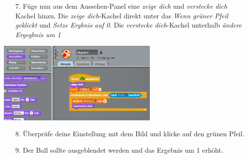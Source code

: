 \begin{itemize}
\item[7.] Füge nun aus dem Aussehen-Panel eine \textit{zeige dich} und \textit{verstecke dich} Kachel hinzu.
\subitem Die \textit{zeige dich}-Kachel direkt unter das \textit{Wenn grüner Pfeil geklickt} und \textit{Setze Ergbnis auf 0}.
\subitem Die \textit{verstecke dich}-Kachel unterhalb \textit{ändere Ergegbnis um 1}
\end{itemize}
\includegraphics[width=0.6\textwidth]{images/aufgabe3_ball2b.png}
\begin{itemize}
\item[8.] Überprüfe deine Einstellung mit dem Bild und klicke auf den grünen Pfeil.
\item[9.] Der Ball sollte ausgeblendet werden und das Ergebnis um 1 erhöht.
\end{itemize}

